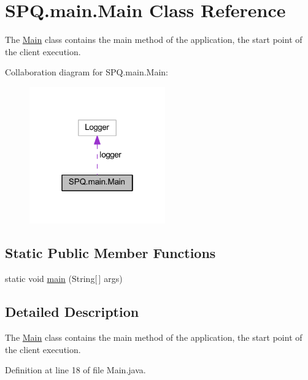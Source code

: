 \hypertarget{class_s_p_q_1_1main_1_1_main}{}\section{S\+P\+Q.\+main.\+Main Class Reference}
\label{class_s_p_q_1_1main_1_1_main}


The \mbox{\hyperlink{class_s_p_q_1_1main_1_1_main}{Main}} class contains the main method of the application, the start point of the client execution.  




Collaboration diagram for S\+P\+Q.\+main.\+Main\+:
\nopagebreak
\begin{figure}[H]
\begin{center}
\leavevmode
\includegraphics[width=166pt]{class_s_p_q_1_1main_1_1_main__coll__graph}
\end{center}
\end{figure}
\subsection*{Static Public Member Functions}
\begin{DoxyCompactItemize}
\item 
static void \mbox{\hyperlink{class_s_p_q_1_1main_1_1_main_ac7d2350f6924287c711b7e2bf1c430fa}{main}} (String\mbox{[}$\,$\mbox{]} args)
\end{DoxyCompactItemize}


\subsection{Detailed Description}
The \mbox{\hyperlink{class_s_p_q_1_1main_1_1_main}{Main}} class contains the main method of the application, the start point of the client execution. 

Definition at line 18 of file Main.\+java.



